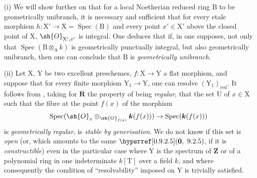 \begin{remarks}[7.9.10]
\label{IV.7.9.10}
(i) We will show further on  that for a local Noetherian reduced ring $\mathrm{B}$ to be geometrically unibranch, it is necessary and sufficient that for every etale morphism $h:\mathrm{X}'\to\mathrm{X}=\operatorname{Spec}(\mathrm{B})$ and every point $x'\in\mathrm{X}'$ above the closed point of $\mathrm{X}$, $\sh{O}_{\mathrm{X}',x'}$ is integral. One deduces that if, in  one supposes, not only that $\operatorname{Spec}(\mathrm{B}\otimes_\mathrm{A} k)$ is geometrically punctually integral, but also geometrically unibranch, then one can conclude that $\mathrm{B}$ is \emph{geometrically unibranch}.


(ii) Let $\mathrm{X}$, $\mathrm{Y}$ be two excellent preschemes, $f:\mathrm{X}\to\mathrm{Y}$ a flat morphism, and suppose that for every finite morphism $\mathrm{Y}_1\to\mathrm{Y}$, one can resolve $(\mathrm{Y}_1)_{\mathrm{red}}$. It follows from , taking for $\boldsymbol{R}$ the property of being \emph{regular}, that the set $\mathrm{U}$ of $x\in\mathrm{X}$ such that the fibre at the point $f(x)$ of the morphism
\[
  \operatorname{Spec}(\sh{O}_x\otimes_{\sh{O}_{f(x)}}\boldsymbol{k}(f(x)))\to\operatorname{Spec}(\boldsymbol{k}(f(x)))
\]
is \emph{geometrically regular}, is \emph{stable by generisation}. We do not know if this set is \emph{open} (or, which amounts to the same $\sref[0]{0.9.2.5}$, if it is \emph{constructible}) even in the particular case where $\mathrm{Y}$ is the spectrum of $\mathbf{Z}$ or of a polynomial ring in one indeterminate $k[\mathrm{T}]$ over a field $k$, and where consequently the condition of ``resolvability'' imposed on $\mathrm{Y}$ is trivially satisfied.
\end{remarks}
